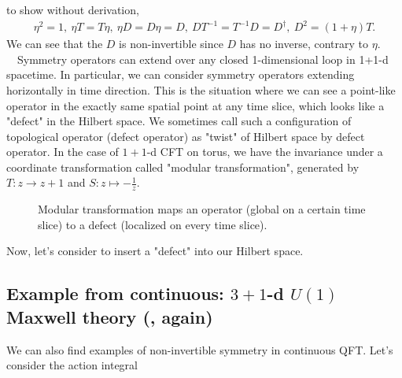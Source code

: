 \documentclass{ltjsarticle}
\theoremstyle{mystyle} %
\numberwithin{equation}{section}
\begin{document}
to show without derivation, 
\begin{align}
    \eta^2=1, ~\eta T = T \eta, ~\eta D = D \eta = D, ~ DT^{-1} = T^{-1}D = D^\dagger, ~
    D^2 = (1+\eta)T. 
    \label{IsingSym}
\end{align}
We can see that the $D$ is non-invertible since $D$ has no inverse, contrary to $\eta$. 
\\
　Symmetry operators can extend over any closed 1-dimensional loop in 1+1-d spacetime. 
In particular, we can consider symmetry operators extending horizontally in time direction. 
This is the situation where we can see a point-like operator in the exactly same spatial point at any time slice, 
which looks like a "defect" in the Hilbert space. 
We sometimes call such a configuration of topological operator (defect operator) as "twist" of Hilbert space by defect operator. 
In the case of $1+1$-d CFT on torus, we have the invariance under a coordinate transformation called "modular transformation", 
generated by $T: z\to z + 1$ and $S: z\mapsto -\frac{1}{z}$. 
\begin{figure}[H]
    \centering
    \caption{Modular transformation maps an operator (global on a certain time slice) to a defect (localized on every time slice). }
    \label{SymmetryAndDefect}
    \end{figure}
Now, let's consider to insert a "defect" into our Hilbert space. 
\subsection{Example from continuous: $3+1$-d $U(1)$ Maxwell theory (, again)}
We can also find examples of non-invertible symmetry in continuous QFT. 
Let's consider the action integral
\newpage
\end{document}
